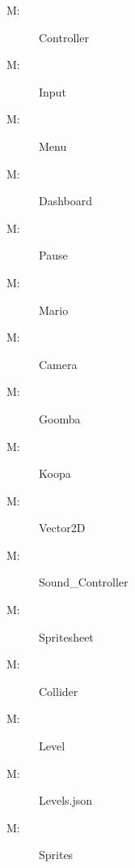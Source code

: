 \documentclass[12pt, titlepage]{article}
\newcounter{mnum}
\newcommand{\mthemnum}{M\themnum}
\begin{document}
\begin{description}
\item [ \mthemnum \label{mController}:] Controller
\item [ \mthemnum \label{mInput}:] Input
\item [ \mthemnum \label{mMenu}:] Menu
\item [ \mthemnum \label{mDashboard}:] Dashboard
\item [ \mthemnum \label{mPause}:] Pause
\item [ \mthemnum \label{mMario}:] Mario
\item [ \mthemnum \label{mCamera}:] Camera
\item [ \mthemnum \label{mGoomba}:] Goomba
\item [ \mthemnum \label{mKoopa}:] Koopa
\item [ \mthemnum \label{mVector2D}:] Vector2D
\item [ \mthemnum \label{mSound}:] Sound\_Controller
\item [ \mthemnum \label{mSpritesheet}:] Spritesheet
\item [ \mthemnum \label{mCollider}:] Collider
\item [ \mthemnum \label{mLevel}:] Level
\item [ \mthemnum \label{mLevels}:] Levels.json
\item [ \mthemnum \label{mSprites}:] Sprites
\end{description}
\end{document}
